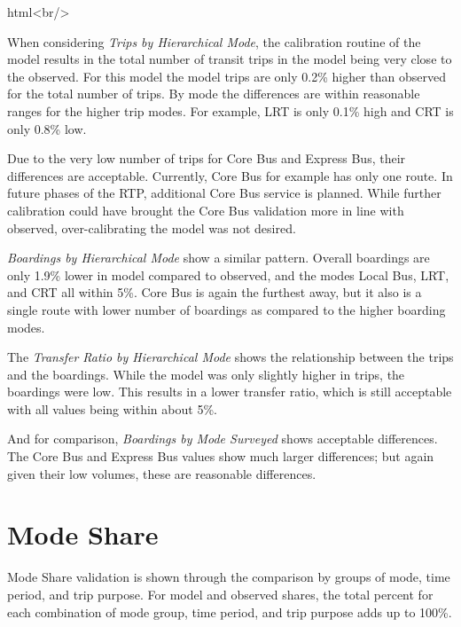 \documentclass[
  letterpaper,
  DIV=11,
  numbers=noendperiod]{scrreprt}
\newenvironment{Shaded}{\begin{snugshade}}{\end{snugshade}}
\newcommand{\NormalTok}[1]{\textcolor[rgb]{0.00,0.23,0.31}{#1}}
\begin{document}
\begin{Shaded}
\begin{Highlighting}[]
\NormalTok{html\textasciigrave{}\textless{}br/\textgreater{}\textasciigrave{}}
\end{Highlighting}
\end{Shaded}

When considering \emph{Trips by Hierarchical Mode}, the calibration
routine of the model results in the total number of transit trips in the
model being very close to the observed. For this model the model trips
are only 0.2\% higher than observed for the total number of trips. By
mode the differences are within reasonable ranges for the higher trip
modes. For example, LRT is only 0.1\% high and CRT is only 0.8\% low.

Due to the very low number of trips for Core Bus and Express Bus, their
differences are acceptable. Currently, Core Bus for example has only one
route. In future phases of the RTP, additional Core Bus service is
planned. While further calibration could have brought the Core Bus
validation more in line with observed, over-calibrating the model was
not desired.

\emph{Boardings by Hierarchical Mode} show a similar pattern. Overall
boardings are only 1.9\% lower in model compared to observed, and the
modes Local Bus, LRT, and CRT all within 5\%. Core Bus is again the
furthest away, but it also is a single route with lower number of
boardings as compared to the higher boarding modes.

The \emph{Transfer Ratio by Hierarchical Mode} shows the relationship
between the trips and the boardings. While the model was only slightly
higher in trips, the boardings were low. This results in a lower
transfer ratio, which is still acceptable with all values being within
about 5\%.

And for comparison, \emph{Boardings by Mode Surveyed} shows acceptable
differences. The Core Bus and Express Bus values show much larger
differences; but again given their low volumes, these are reasonable
differences.

\hypertarget{mode-share}{%
\section{Mode Share}\label{mode-share}}

Mode Share validation is shown through the comparison by groups of mode,
time period, and trip purpose. For model and observed shares, the total
percent for each combination of mode group, time period, and trip
purpose adds up to 100\%.
\end{document}
